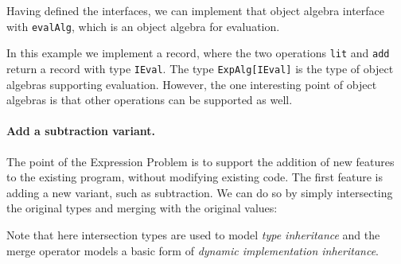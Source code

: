 Having defined the interfaces, we can implement that object algebra interface
with \lstinline$evalAlg$, which is an object algebra for evaluation. 
\begin{comment}
  \begin{lstlisting}{language=F2J}
    let evalAlg: ExpAlg[IEval] = {
      lit = \(x: Int) -> {eval = x},
      add = \(x: IEval) (y: IEval) -> {
        eval = x.eval + y.eval
      }
    };
  \end{lstlisting}
\end{comment}

In this example we implement a record, where the two operations 
\lstinline{lit} and \lstinline{add} return a record with type \lstinline{IEval}.
The type \lstinline$ExpAlg[IEval]$ is the type of object algebras
supporting evaluation. However, the one interesting point
of object algebras is that other operations can be supported as
well. 

\paragraph{Add a subtraction variant.} The point of the Expression
Problem is to support the addition of new features to the existing
program, without modifying existing code. 
The first feature is adding a new variant, such as subtraction. We can do so by
simply intersecting the original types and merging with the original values:

\begin{comment}
  \begin{lstlisting}{language=F2J}
    type SubExpAlg[E] = 
    ExpAlg[E] & {sub: E -> E -> E};
    let subEvalAlg = evalAlg ,, {
      sub = \(x: IEval) (y: IEval) -> { 
        eval = x.eval - y.eval 
      }
    };
  \end{lstlisting}
\end{comment}


\noindent Note that here intersection types are used to model \emph{type
  inheritance} and the merge operator models a basic form of
\emph{dynamic implementation inheritance}. 

